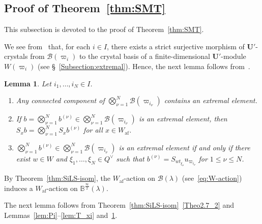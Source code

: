 \documentclass[10pt]{amsart}
\newtheorem{lemm}[theo]{Lemma}
\theoremstyle{definition}\newtheorem{defi}[theo]{Definition}
\theoremstyle{remark}\newtheorem{rema}[theo]{Remark}
\newcommand\bm[1]{\boldsymbol{#1}}
\newcommand{\U}{\mathbf{U}}
\newcommand{\si}{\frac{\infty}{2}}
\DeclareMathOperator{\af}{af}
\begin{document}
\subsection{Proof of Theorem~\ref{thm:SMT}} \label{Subsection:pf-SMT}
This subsection is devoted to the proof of Theorem~\ref{thm:SMT}.

We see from~\cite[Theorem~5.17]{K02} 
that, for each $i \in I$, there exists a strict surjective morphism of $\U'$-crystals from 
$\mathcal{B}(\varpi_i)$
to the crystal basis of a finite-dimensional $\U'$-module
$W(\varpi_i)$ (see \S~\ref{Subsection:extremal}). 
Hence, the next lemma follows from~\cite[Lemmas~1.5--1.6]{AK}. 

\begin{lemm} \label{lem:extremal-vectors}
Let 
$i_1 , \ldots , i_N \in I$. 
\begin{enumerate}[label=(\arabic*)]
\item\label{Theo3.6_1}
Any connected component of 
$\bigotimes_{\nu = 1}^N \mathcal{B}(\varpi_{i_{\nu}})$ 
contains an extremal element.
\item\label{Theo3.6_2}
If 
$b = \bigotimes_{\nu = 1}^N b^{(\nu)} \in \bigotimes_{\nu = 1}^N \mathcal{B}(\varpi_{i_{\nu}})$
is an extremal element, then 
$S_x b = \bigotimes_{\nu = 1}^N S_x b^{(\nu)}$ 
for all 
$x \in W_{\af}$. 
\item\label{Theo3.6_3}
$\bigotimes_{\nu = 1}^N b^{(\nu)} \in \bigotimes_{\nu = 1}^N \mathcal{B}(\varpi_{i_{\nu}})$
is an extremal element if and only if there exist
$w \in W$ 
and 
$\xi_1 , \ldots , \xi_N \in Q^{\vee}$ 
such that 
$b^{(\nu)} = S_{wt_{\xi_{\nu}}} u_{\varpi_{i_{\nu}}}$
for 
$1 \leq \nu \leq N$. 
\end{enumerate}
\end{lemm}

By Theorem~\ref{thm:SiLS-isom}, 
the $W_{\af}$-action on $\mathcal{B}(\lambda)$ (see~\eqref{eq:W-action})
induces a $W_{\af}$-action on $\mathbb{B}^{\si}(\lambda)$.

The next lemma follows from 
Theorem~\ref{thm:SiLS-isom}~\ref{Theo2.7_2} and 
Lemmas~\ref{lem:Pi}--\ref{lem:T_xi} and~\ref{lem:extremal-vectors}.
\end{document}
